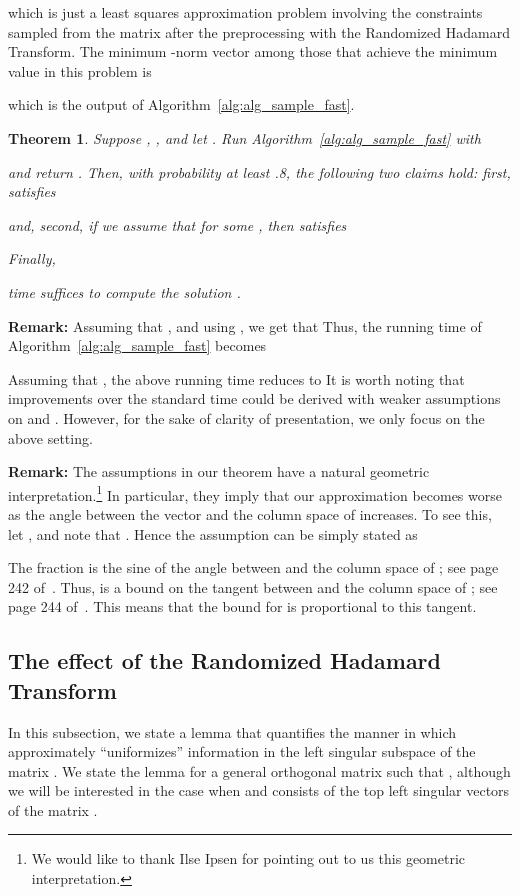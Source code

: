 \documentclass[11pt]{article}
\newtheorem{theorem}{Theorem}
\begin{document}
which is just a least squares approximation problem involving the  constraints sampled from the matrix  after the preprocessing with the Randomized Hadamard Transform. The minimum -norm vector  among those that achieve the minimum value  in this problem is

which is the output of Algorithm~\ref{alg:alg_sample_fast}.
\begin{theorem}
\label{thm:alg_sample_fast}
Suppose , , and let . Run Algorithm~\ref{alg:alg_sample_fast} with

and return . Then, with probability at least .8, the following two claims hold: first,  satisfies

and, second, if we assume that  for some , then  satisfies

Finally,

time suffices to compute the solution .
\end{theorem}
\noindent \textbf{Remark:} Assuming that , and using , we get that  Thus, the running time of Algorithm~\ref{alg:alg_sample_fast} becomes

Assuming that , the above running time reduces to  It is worth noting that improvements over the standard  time could be derived with weaker assumptions on  and . However, for the sake of clarity of presentation, we only focus on the above setting.

\noindent \textbf{Remark:}
The assumptions in our theorem have a natural geometric interpretation.\footnote{We would like to thank Ilse Ipsen for pointing out to us this
geometric interpretation.}
In particular, they imply that our approximation becomes worse as the angle
between the vector  and the column space of  increases.
To see this, let , and note that
.
Hence the assumption
 can be simply stated as

The fraction  is the sine of the angle between  and
the column space of ; see page 242 of~\cite{GVL96}.
Thus,  is a bound on the tangent between  and the
column space of ; see page 244 of~\cite{GVL96}.
This means that the bound for  is
proportional to this tangent.

\subsection{The effect of the Randomized Hadamard Transform}
\label{sxn:review_previous:hadamard}

In this subsection, we state a lemma that quantifies the manner in which  approximately ``uniformizes'' information in the left singular subspace of the matrix . We state the lemma for a general  orthogonal matrix  such that , although we will be interested in the case when  and  consists of the top  left singular vectors of the matrix .
\end{document}
